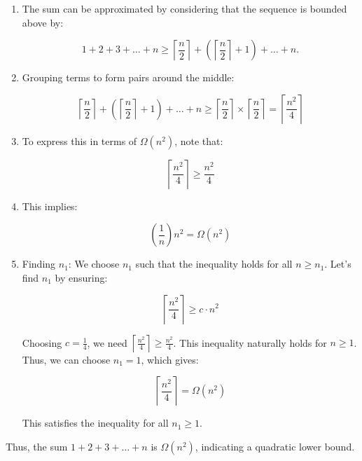     \begin{example}
        \begin{enumerate}
            \item The sum can be approximated by considering that the sequence is bounded above by:
        
            \[
            1 + 2 + 3 + \ldots + n \geq \left\lceil \frac{n}{2} \right\rceil + \left( \left\lceil \frac{n}{2} \right\rceil + 1 \right) + \ldots + n.
            \]
        
            \item Grouping terms to form pairs around the middle:
        
            \[
                \left\lceil \frac{n}{2} \right\rceil + \left( \left\lceil \frac{n}{2} \right\rceil + 1 \right) + \ldots + n \geq \left\lceil \frac{n}{2} \right\rceil \times \left\lceil \frac{n}{2} \right\rceil = \left\lceil \frac{n^2}{4} \right\rceil
            \]
        
            \item To express this in terms of \( \Omega(n^2) \), note that:
        
            \[
            \left\lceil \frac{n^2}{4} \right\rceil \geq \frac{n^2}{4}
            \]
        
            \item This implies:
        
            \[
            \left( \frac{1}{n} \right)n^2 = \Omega(n^2)
            \]
        
            \item Finding \( n_1 \): We choose \( n_1 \) such that the inequality holds for all \( n \geq n_1 \). Let's find \( n_1 \) by ensuring:
        
            \[
            \left\lceil \frac{n^2}{4} \right\rceil \geq c \cdot n^2
            \]
        
            Choosing \( c = \frac{1}{4} \), we need \( \left\lceil \frac{n^2}{4} \right\rceil \geq \frac{n^2}{4} \). This inequality naturally holds for \( n \geq 1 \). Thus, we can choose \( n_1 = 1 \), which gives:
        
            \[
            \left\lceil \frac{n^2}{4} \right\rceil = \Omega(n^2)
            \]
        
            This satisfies the inequality for all \( n_1 \geq 1 \).
        \end{enumerate}
        
        Thus, the sum \( 1 + 2 + 3 + \ldots + n \) is \( \Omega(n^2) \), indicating a quadratic lower bound.        
    \end{example}

